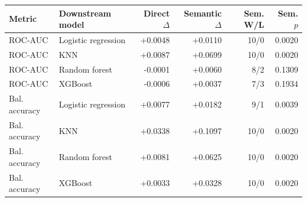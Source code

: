 \begin{tabular}{llrrrr}
\toprule
Metric & Downstream model & Direct $\Delta$ & Semantic $\Delta$ & Sem. W/L & Sem. $p$ \\
\midrule
ROC-AUC & Logistic regression & +0.0048 & +0.0110 & 10/0 & 0.0020 \\
ROC-AUC & KNN & +0.0087 & +0.0699 & 10/0 & 0.0020 \\
ROC-AUC & Random forest & -0.0001 & +0.0060 & 8/2 & 0.1309 \\
ROC-AUC & XGBoost & -0.0006 & +0.0037 & 7/3 & 0.1934 \\
\midrule
Bal. accuracy & Logistic regression & +0.0077 & +0.0182 & 9/1 & 0.0039 \\
Bal. accuracy & KNN & +0.0338 & +0.1097 & 10/0 & 0.0020 \\
Bal. accuracy & Random forest & +0.0081 & +0.0625 & 10/0 & 0.0020 \\
Bal. accuracy & XGBoost & +0.0033 & +0.0328 & 10/0 & 0.0020 \\
\bottomrule
\end{tabular}
